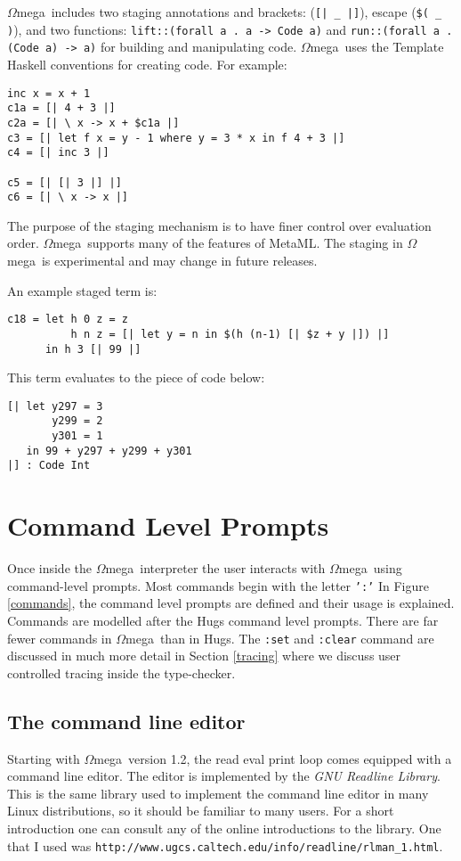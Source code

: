 \documentclass[11pt,twoside]{article}
\newcommand{\om}{$\Omega$mega}
\begin{document}
\om\ includes two staging annotations and brackets: (\verb+[| _ |]+),
escape (\verb+$( _ )+), and two functions: 
{\tt lift::(forall a . a -> Code a)} and {\tt run::(forall a . (Code a) -> a)}
for building and manipulating code. \om\ uses
the Template Haskell\cite{Sheard02} conventions for creating code. For example:
\begin{verbatim}
inc x = x + 1
c1a = [| 4 + 3 |]
c2a = [| \ x -> x + $c1a |]
c3 = [| let f x = y - 1 where y = 3 * x in f 4 + 3 |]
c4 = [| inc 3 |]

c5 = [| [| 3 |] |]
c6 = [| \ x -> x |]
\end{verbatim}

The purpose of the staging mechanism is to have finer control over
evaluation order. \om\ supports many of the features of
MetaML\cite{Sheard:1999:UMS,TS00}. The staging in \om\ is experimental and
may change in future releases.

An example staged term is:
\begin{verbatim}
c18 = let h 0 z = z
          h n z = [| let y = n in $(h (n-1) [| $z + y |]) |]
      in h 3 [| 99 |]
\end{verbatim}
This term evaluates to the piece of code below:
\begin{verbatim}
[| let y297 = 3
       y299 = 2
       y301 = 1
   in 99 + y297 + y299 + y301 
|] : Code Int
\end{verbatim}

\section{Command Level Prompts}  \label{command}



Once inside the \om\ interpreter the user interacts
with \om\ using command-level prompts. Most
commands begin with the letter {\tt ':'}
In Figure \ref{commands}, the command level prompts are defined and their
usage is explained. Commands are modelled after the Hugs command
level prompts. There are far fewer commands in \om\ than in Hugs.
The {\tt :set} and {\tt :clear} command are discussed
in much more detail in Section \ref{tracing} where we discuss 
user controlled tracing inside the type-checker.

\subsection{The command line editor}
Starting with \om\ version 1.2, the read eval print loop comes
equipped with a command line editor. The editor is implemented
by the {\em GNU Readline Library}. This is the same
library used to implement the command line editor
in many Linux distributions, so it should be familiar to
many users. For a short introduction
one can consult any of the online introductions
to the library. One that I used
was \verb+http://www.ugcs.caltech.edu/info/readline/rlman_1.html+.
\end{document}
